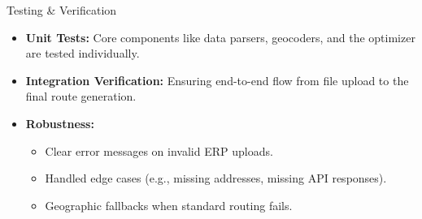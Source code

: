 \begin{frame}{Testing \& Verification}
\begin{itemize}
    \item \textbf{Unit Tests:} Core components like data parsers, geocoders, and the optimizer are tested individually.
    \item \textbf{Integration Verification:} Ensuring end-to-end flow from file upload to the final route generation.
    \item \textbf{Robustness:} 
        \begin{itemize}
            \item Clear error messages on invalid ERP uploads.
            \item Handled edge cases (e.g., missing addresses, missing API responses).
            \item Geographic fallbacks when standard routing fails.
        \end{itemize}
\end{itemize}
\end{frame}
